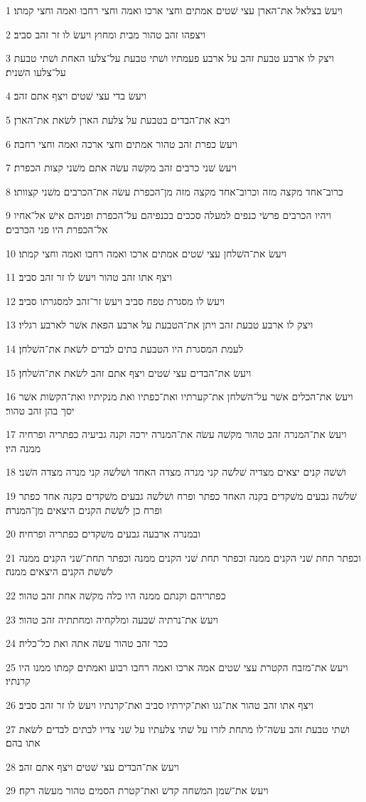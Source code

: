 \par 1 ויעשׂ בצלאל את־הארן עצי שׁטים אמתים וחצי ארכו ואמה וחצי רחבו ואמה וחצי קמתו׃
\par 2 ויצפהו זהב טהור מבית ומחוץ ויעשׂ לו זר זהב סביב׃
\par 3 ויצק לו ארבע טבעת זהב על ארבע פעמתיו ושׁתי טבעת על־צלעו האחת ושׁתי טבעת על־צלעו השׁנית׃
\par 4 ויעשׂ בדי עצי שׁטים ויצף אתם זהב׃
\par 5 ויבא את־הבדים בטבעת על צלעת הארן לשׂאת את־הארן׃
\par 6 ויעשׂ כפרת זהב טהור אמתים וחצי ארכה ואמה וחצי רחבה׃
\par 7 ויעשׂ שׁני כרבים זהב מקשׁה עשׂה אתם משׁני קצות הכפרת׃
\par 8 כרוב־אחד מקצה מזה וכרוב־אחד מקצה מזה מן־הכפרת עשׂה את־הכרבים משׁני קצוותו׃
\par 9 ויהיו הכרבים פרשׂי כנפים למעלה סככים בכנפיהם על־הכפרת ופניהם אישׁ אל־אחיו אל־הכפרת היו פני הכרבים׃
\par 10 ויעשׂ את־השׁלחן עצי שׁטים אמתים ארכו ואמה רחבו ואמה וחצי קמתו׃
\par 11 ויצף אתו זהב טהור ויעשׂ לו זר זהב סביב׃
\par 12 ויעשׂ לו מסגרת טפח סביב ויעשׂ זר־זהב למסגרתו סביב׃
\par 13 ויצק לו ארבע טבעת זהב ויתן את־הטבעת על ארבע הפאת אשׁר לארבע רגליו׃
\par 14 לעמת המסגרת היו הטבעת בתים לבדים לשׂאת את־השׁלחן׃
\par 15 ויעשׂ את־הבדים עצי שׁטים ויצף אתם זהב לשׂאת את־השׁלחן׃
\par 16 ויעשׂ את־הכלים אשׁר על־השׁלחן את־קערתיו ואת־כפתיו ואת מנקיתיו ואת־הקשׂות אשׁר יסך בהן זהב טהור׃
\par 17 ויעשׂ את־המנרה זהב טהור מקשׁה עשׂה את־המנרה ירכה וקנה גביעיה כפתריה ופרחיה ממנה היו׃
\par 18 ושׁשׁה קנים יצאים מצדיה שׁלשׁה קני מנרה מצדה האחד ושׁלשׁה קני מנרה מצדה השׁני׃
\par 19 שׁלשׁה גבעים משׁקדים בקנה האחד כפתר ופרח ושׁלשׁה גבעים משׁקדים בקנה אחד כפתר ופרח כן לשׁשׁת הקנים היצאים מן־המנרה׃
\par 20 ובמנרה ארבעה גבעים משׁקדים כפתריה ופרחיה׃
\par 21 וכפתר תחת שׁני הקנים ממנה וכפתר תחת שׁני הקנים ממנה וכפתר תחת־שׁני הקנים ממנה לשׁשׁת הקנים היצאים ממנה׃
\par 22 כפתריהם וקנתם ממנה היו כלה מקשׁה אחת זהב טהור׃
\par 23 ויעשׂ את־נרתיה שׁבעה ומלקחיה ומחתתיה זהב טהור׃
\par 24 ככר זהב טהור עשׂה אתה ואת כל־כליה׃
\par 25 ויעשׂ את־מזבח הקטרת עצי שׁטים אמה ארכו ואמה רחבו רבוע ואמתים קמתו ממנו היו קרנתיו׃
\par 26 ויצף אתו זהב טהור את־גגו ואת־קירתיו סביב ואת־קרנתיו ויעשׂ לו זר זהב סביב׃
\par 27 ושׁתי טבעת זהב עשׂה־לו מתחת לזרו על שׁתי צלעתיו על שׁני צדיו לבתים לבדים לשׂאת אתו בהם׃
\par 28 ויעשׂ את־הבדים עצי שׁטים ויצף אתם זהב׃
\par 29 ויעשׂ את־שׁמן המשׁחה קדשׁ ואת־קטרת הסמים טהור מעשׂה רקח׃


